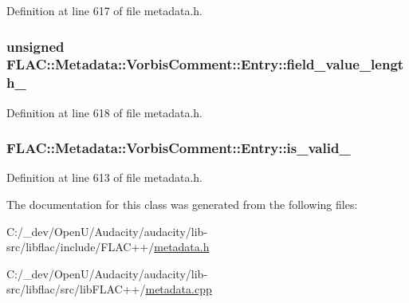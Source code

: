 Definition at line 617 of file metadata.\+h.

\subsubsection[{\texorpdfstring{field\+\_\+value\+\_\+length\+\_\+}{field_value_length_}}]{\setlength{\rightskip}{0pt plus 5cm}unsigned F\+L\+A\+C\+::\+Metadata\+::\+Vorbis\+Comment\+::\+Entry\+::field\+\_\+value\+\_\+length\+\_\+\hspace{0.3cm}{\ttfamily [protected]}}\hypertarget{class_f_l_a_c_1_1_metadata_1_1_vorbis_comment_1_1_entry_aec6d93f021349712ccfcbbe4acc57b0d}{}\label{class_f_l_a_c_1_1_metadata_1_1_vorbis_comment_1_1_entry_aec6d93f021349712ccfcbbe4acc57b0d}


Definition at line 618 of file metadata.\+h.

\subsubsection[{\texorpdfstring{is\+\_\+valid\+\_\+}{is_valid_}}]{ F\+L\+A\+C\+::\+Metadata\+::\+Vorbis\+Comment\+::\+Entry\+::is\+\_\+valid\+\_\+\hspace{0.3cm}{\ttfamily [protected]}}\hypertarget{class_f_l_a_c_1_1_metadata_1_1_vorbis_comment_1_1_entry_a4e05497ba9a9e4e5e5e00e9e0de3313f}{}\label{class_f_l_a_c_1_1_metadata_1_1_vorbis_comment_1_1_entry_a4e05497ba9a9e4e5e5e00e9e0de3313f}


Definition at line 613 of file metadata.\+h.



The documentation for this class was generated from the following files\+:\begin{DoxyCompactItemize}
\item 
C\+:/\+\_\+dev/\+Open\+U/\+Audacity/audacity/lib-\/src/libflac/include/\+F\+L\+A\+C++/\hyperlink{include_2_f_l_a_c_09_09_2metadata_8h}{metadata.\+h}\item 
C\+:/\+\_\+dev/\+Open\+U/\+Audacity/audacity/lib-\/src/libflac/src/lib\+F\+L\+A\+C++/\hyperlink{lib_f_l_a_c_09_09_2metadata_8cpp}{metadata.\+cpp}\end{DoxyCompactItemize}
